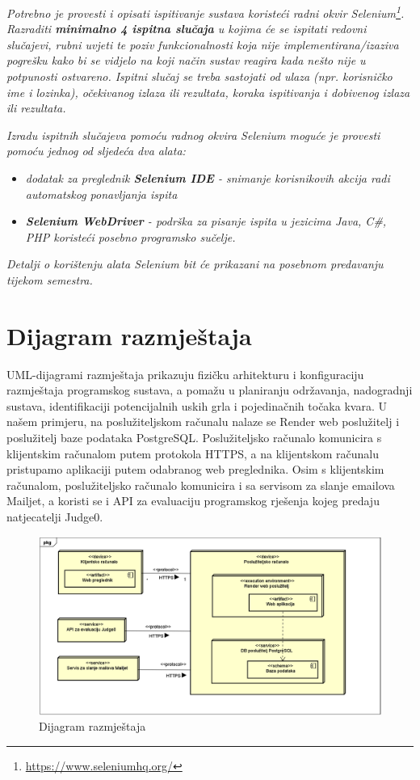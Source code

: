 \textit{Potrebno je provesti i opisati ispitivanje sustava koristeći radni okvir Selenium\footnote{\url{https://www.seleniumhq.org/}}. Razraditi \textbf{minimalno 4 ispitna slučaja} u kojima će se ispitati redovni slučajevi, rubni uvjeti te poziv funkcionalnosti koja nije implementirana/izaziva pogrešku kako bi se vidjelo na koji način sustav reagira kada nešto nije u potpunosti ostvareno. Ispitni slučaj se treba sastojati od ulaza (npr. korisničko ime i lozinka), očekivanog izlaza ili rezultata, koraka ispitivanja i dobivenog izlaza ili rezultata.\\ }

\textit{Izradu ispitnih slučajeva pomoću radnog okvira Selenium moguće je provesti pomoću jednog od sljedeća dva alata:}
\begin{itemize}
	\item \textit{dodatak za preglednik \textbf{Selenium IDE} - snimanje korisnikovih akcija radi automatskog ponavljanja ispita	}
	\item \textit{\textbf{Selenium WebDriver} - podrška za pisanje ispita u jezicima Java, C\#, PHP koristeći posebno programsko sučelje.}
\end{itemize}
\textit{Detalji o korištenju alata Selenium bit će prikazani na posebnom predavanju tijekom semestra.}

\eject


\section{Dijagram razmještaja}

UML-dijagrami razmještaja prikazuju fizičku arhitekturu i konfiguraciju razmještaja programskog sustava, a pomažu u planiranju održavanja, nadogradnji sustava, identifikaciji potencijalnih uskih grla i pojedinačnih točaka kvara. U našem primjeru, na poslužiteljskom računalu nalaze se Render web poslužitelj i poslužitelj baze podataka PostgreSQL. Poslužiteljsko računalo komunicira s klijentskim računalom putem protokola HTTPS, a na klijentskom računalu pristupamo aplikaciji putem odabranog web preglednika. Osim s klijentskim računalom, poslužiteljsko računalo komunicira i sa servisom za slanje emailova Mailjet, a koristi se i API za evaluaciju programskog rješenja kojeg predaju natjecatelji Judge0.

\begin{figure}[H]
	\includegraphics[scale=0.70]{dijagrami/dijagram_razmjestaja}
	\centering
	\caption{Dijagram razmještaja}
\end{figure}

